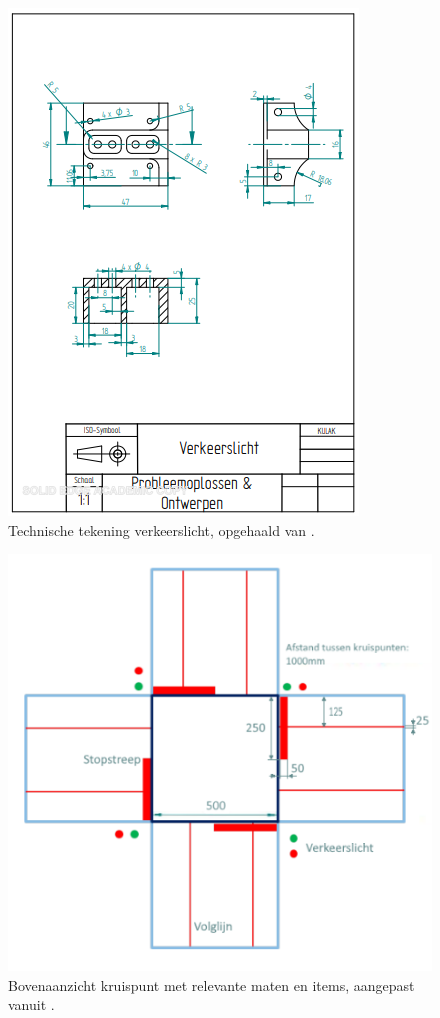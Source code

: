 \documentclass[a4paper,twoside,kulak]{kulakreport}
\begin{document}
	\begin{figure}
		\centering
		\includegraphics[width=.8\textwidth]{verkeerslicht}
		\caption{Technische tekening verkeerslicht, opgehaald van \cite{artikel1}. }
		\label{fig: verkeerslicht}
	\end{figure}
	\bigskip
	\begin{figure}
		\centering
		\includegraphics[width=.8\textwidth]{bovenaanzichtkruispunt}
		\caption{Bovenaanzicht kruispunt met relevante maten en items, aangepast vanuit \cite{Smart}.
		}
		\label{fig: kruispunt}
		
	\end{figure}
\end{document}
